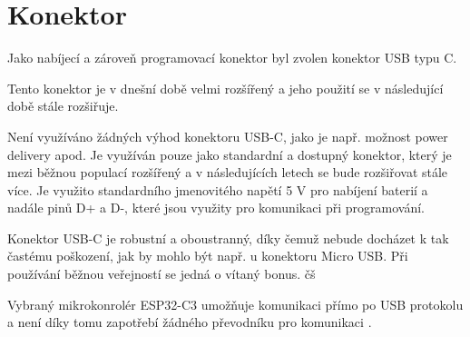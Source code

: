 
\section{Konektor}
Jako nabíjecí a zároveň programovací konektor byl zvolen konektor USB typu C.

Tento konektor je v dnešní době velmi rozšířený a jeho použití se v následující době stále rozšiřuje. 

Není využíváno žádných výhod konektoru USB-C, jako je např. možnost power delivery apod. Je využíván pouze jako standardní a dostupný konektor, který je mezi běžnou
populací rozšířený a v následujících letech se bude rozšiřovat stále více. Je využito standardního jmenovitého napětí 5 V pro nabíjení baterií a nadále pinů D+ a D-, 
které jsou využity pro komunikaci při programování. 

Konektor USB-C je robustní a oboustranný, díky čemuž nebude docházet k tak častému poškození, jak by mohlo být např. u konektoru Micro USB. Při používání běžnou veřejností
se jedná o vítaný bonus. čš

Vybraný mikrokonrolér ESP32-C3 umožňuje komunikaci přímo po USB protokolu a není díky tomu zapotřebí žádného převodníku pro komunikaci \cite{ESP_C3_dtsh}. %





